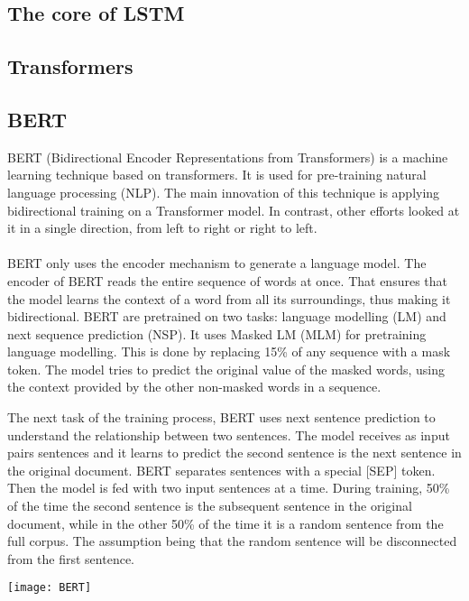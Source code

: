 \subsection{The core of LSTM}
\subsection{Transformers}
\subsection{BERT}
BERT (Bidirectional Encoder Representations from Transformers) is a machine learning technique based on transformers. It is used for pre-training natural language processing (NLP). The main innovation of this technique is applying bidirectional training on a Transformer model. In contrast, other efforts looked at it in a single direction, from left to right or right to left. \\\\
BERT only uses the encoder mechanism to generate a language model. The encoder of BERT reads the entire sequence of words at once. That ensures that the model learns the context of a word from all its surroundings, thus making it bidirectional. 
BERT are pretrained on two tasks: language modelling (LM) and next sequence prediction (NSP). It uses Masked LM (MLM) for pretraining language modelling. This is done by replacing 15\% of any sequence with a mask token. The model tries to predict the original value of the masked words, using the context provided by the other non-masked words in a sequence. 

The next task of the training process, BERT uses next sentence prediction to understand the relationship between two sentences. The model receives as input pairs sentences and it learns to predict the second sentence is the next sentence in the original document. BERT separates sentences with a special [SEP] token. Then the model is fed with two input sentences at a time. During training, 50\% of the time the second sentence is the subsequent sentence in the original document, while in the other 50\% of the time it is a random sentence from the full corpus. The assumption being that the random sentence will be disconnected from the first sentence. 

\texttt{[image: BERT]}